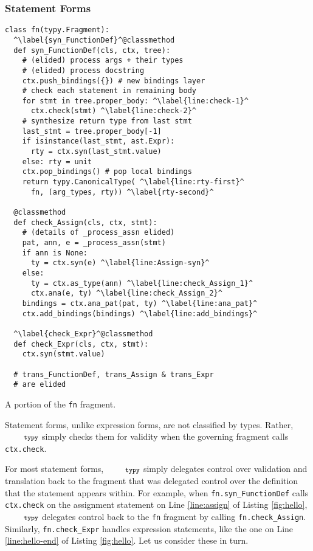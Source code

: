 \documentclass[10pt]{sigplanconf}
\newcommand{\typy}{\texttt{\footnotesize typy}}
\newcommand{\lip}[1]{\lstinline[language=Python,basicstyle=\ttfamily\footnotesize,morekeywords={with},deletendkeywords={tuple,buffer,map}]{#1}}
\newcommand{\li}[1]{\lip{#1}}
\begin{document}
\subsubsection{Statement Forms}\label{sec:statements}
\begin{codelisting}
\vspace{-3px}
\begin{lstlisting}
class fn(typy.Fragment):
  ^\label{syn_FunctionDef}^@classmethod
  def syn_FunctionDef(cls, ctx, tree):
    # (elided) process args + their types
    # (elided) process docstring
    ctx.push_bindings({}) # new bindings layer
    # check each statement in remaining body
    for stmt in tree.proper_body: ^\label{line:check-1}^
      ctx.check(stmt) ^\label{line:check-2}^
    # synthesize return type from last stmt
    last_stmt = tree.proper_body[-1]
    if isinstance(last_stmt, ast.Expr): 
      rty = ctx.syn(last_stmt.value)
    else: rty = unit
    ctx.pop_bindings() # pop local bindings
    return typy.CanonicalType( ^\label{line:rty-first}^
      fn, (arg_types, rty)) ^\label{rty-second}^

  @classmethod
  def check_Assign(cls, ctx, stmt):
    # (details of _process_assn elided)
    pat, ann, e = _process_assn(stmt)
    if ann is None: 
      ty = ctx.syn(e) ^\label{line:Assign-syn}^
    else:
      ty = ctx.as_type(ann) ^\label{line:check_Assign_1}^
      ctx.ana(e, ty) ^\label{line:check_Assign_2}^
    bindings = ctx.ana_pat(pat, ty) ^\label{line:ana_pat}^
    ctx.add_bindings(bindings) ^\label{line:add_bindings}^

  ^\label{check_Expr}^@classmethod
  def check_Expr(cls, ctx, stmt):
    ctx.syn(stmt.value)
    
  # trans_FunctionDef, trans_Assign & trans_Expr
  # are elided 
\end{lstlisting}
\caption{A portion of the \li{fn} fragment.}
\label{fig:fn}
\end{codelisting}
Statement forms, unlike expression forms, are not classified by types. Rather, $\typy$ simply checks them for validity when the governing fragment calls \li{ctx.check}. 

For most statement forms, $\typy$ simply delegates control over validation and translation back to the fragment that was delegated control over the definition that the statement appears within. For example, when \li{fn.syn_FunctionDef} calls \li{ctx.check} on the assignment statement on Line \ref{line:assign} of Listing \ref{fig:hello}, $\typy$ delegates control back to the \li{fn} fragment by calling \li{fn.check_Assign}. Similarly, \li{fn.check_Expr} handles expression statements, like the one on Line \ref{line:hello-end} of Listing \ref{fig:hello}. Let us consider these in turn.
\end{document}
